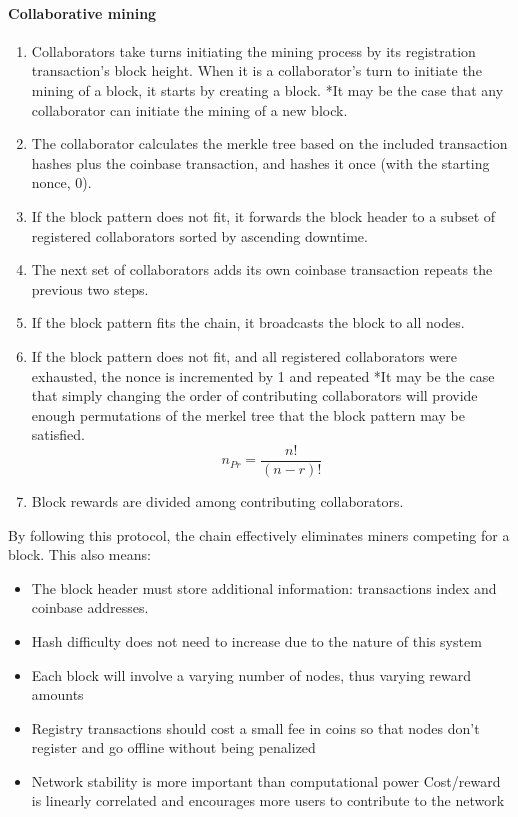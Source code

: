 \documentclass[10pt,twocolumn]{article}
\begin{document}
\paragraph{Collaborative mining}
\begin{enumerate}[noitemsep]
\item Collaborators take turns initiating the mining process by its registration transaction's block height.  When it is a collaborator's turn to initiate the mining of a block, it starts by creating a block. *It may be the case that any collaborator can initiate the mining of a new block.
\item The collaborator calculates the merkle tree based on the included transaction hashes plus the coinbase transaction, and hashes it once (with the starting nonce, 0).
\item If the block pattern does not fit, it forwards the block header to a subset of registered collaborators sorted by ascending downtime. 
\item The next set of collaborators adds its own coinbase transaction repeats the previous two steps.
\item If the block pattern fits the chain, it broadcasts the block to all nodes.
\item If the block pattern does not fit, and all registered collaborators were exhausted, the nonce is incremented by 1 and repeated *It may be the case that simply changing the order of contributing collaborators will provide enough permutations of the merkel tree that the block pattern may be satisfied.
\[{n}_{Pr} = \frac{n!}{(n-r)!}\]
\item Block rewards are divided among contributing collaborators.
\end{enumerate}
By following this protocol, the chain effectively eliminates miners competing for a block.  This also means:
\begin{itemize}[noitemsep]
\item The block header must store additional information: transactions index and coinbase addresses. 
\item Hash difficulty does not need to increase due to the nature of this system
\item Each block will involve a varying number of nodes, thus varying reward amounts
\item Registry transactions should cost a small fee in coins so that nodes don’t register and go offline without being penalized
\item Network stability is more important than computational power
Cost/reward is linearly correlated and encourages more users to contribute to the network
\end{itemize}
\end{document}
